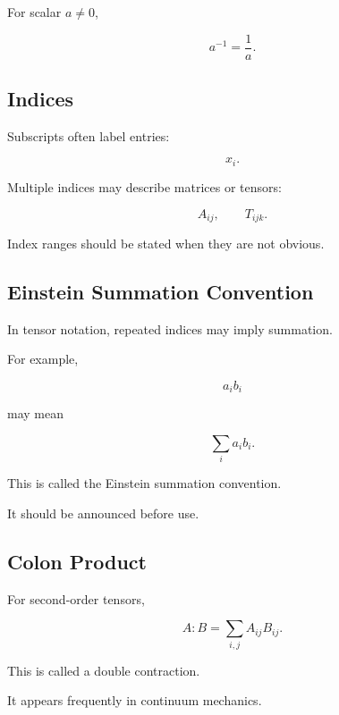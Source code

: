 For scalar \(a\neq0\),

\[
\boxed{
a^{-1}
=
\frac1a.
}
\]

\subsection{Indices}
\label{subsec:index-notation-reference}

Subscripts often label entries:

\[
\boxed{
x_i.
}
\]

Multiple indices may describe matrices or tensors:

\[
\boxed{
A_{ij},
\qquad
T_{ijk}.
}
\]

Index ranges should be stated when they are not obvious.

\subsection{Einstein Summation Convention}
\label{subsec:einstein-summation-reference}

In tensor notation, repeated indices may imply summation.

For example,

\[
\boxed{
a_ib_i
}
\]

may mean

\[
\boxed{
\sum_i a_ib_i.
}
\]

This is called the Einstein summation convention.

It should be announced before use.

\subsection{Colon Product}
\label{subsec:colon-product-reference}

For second-order tensors,

\[
\boxed{
A:B
=
\sum_{i,j}
A_{ij}B_{ij}.
}
\]

This is called a double contraction.

It appears frequently in continuum mechanics.

